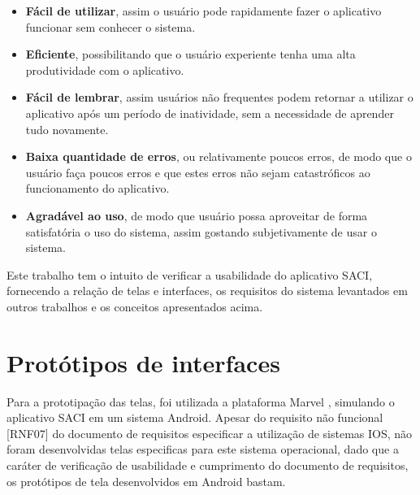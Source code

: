 \documentclass[12pt]{article}
\begin{document}
\begin{itemize}
    \item \textbf{Fácil de utilizar}, assim o usuário pode rapidamente fazer o aplicativo funcionar sem conhecer o sistema.
    \item \textbf{Eficiente}, possibilitando que o usuário experiente tenha uma alta produtividade com o aplicativo.
    \item \textbf{Fácil de lembrar}, assim usuários não frequentes podem retornar a utilizar o aplicativo após um período de inatividade, sem a necessidade de aprender tudo novamente. 
    \item \textbf{Baixa quantidade de erros}, ou relativamente poucos erros, de modo que o usuário faça poucos erros e que estes erros não sejam catastróficos ao funcionamento do aplicativo.
    \item \textbf{Agradável ao uso}, de modo que usuário possa aproveitar de forma satisfatória o uso do sistema, assim gostando subjetivamente de usar o sistema.
\end{itemize}

Este trabalho tem o intuito de verificar a usabilidade do aplicativo SACI, fornecendo a relação de telas e interfaces, os requisitos do sistema levantados em outros trabalhos e os conceitos apresentados acima.



\section{ Protótipos de interfaces}

Para a prototipação das telas, foi utilizada a plataforma Marvel \cite{marvel2019}, simulando o aplicativo SACI em um sistema Android. Apesar do requisito não funcional [RNF07] do documento de requisitos especificar a utilização de sistemas IOS, não foram desenvolvidas telas especificas para este sistema operacional, dado que a caráter de verificação de usabilidade e cumprimento do documento de requisitos, os protótipos de tela desenvolvidos em Android bastam.
\end{document}
